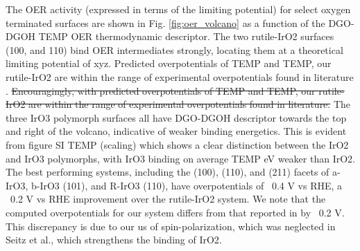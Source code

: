 The OER activity (expressed in terms of the limiting potential) for select oxygen terminated surfaces are shown in Fig. \ref{fig:oer_volcano} as a function of the DGO-DGOH TEMP OER thermodynamic descriptor.
%
The two rutile-IrO2 surfaces (100, and 110) bind OER intermediates  strongly, locating them at a theoretical limiting potential of xyz. Predicted overpotentials of TEMP and TEMP, our rutile-IrO2 are within the range of experimental overpotentials found in literature .
\sout{Encouragingly, with predicted overpotentials of TEMP and TEMP, our rutile-IrO2 are within the range of experimental overpotentials found in literature.}
%
The three IrO3 polymorph surfaces all have DGO-DGOH descriptor towards the top and right of the volcano, indicative of weaker binding energetics.   
%
This is evident from figure SI TEMP (scaling) which shows a clear distinction between the IrO2 and IrO3 polymorphs, with IrO3 binding on average TEMP eV weaker than IrO2.
%
The best performing systems, including the (100), (110), and (211) facets of a-IrO3, b-IrO3 (101), and R-IrO3 (110), have overpotentials of ~0.4 V vs RHE,
a ~0.2 V vs RHE improvement over the rutile-IrO2 system.
%
We note that the computed  overpotentials for our \rIrOtwo system differs from that reported in \cite{Seitz2016} by ~0.2 V. This discrepancy is due to our us of spin-polarization, which was neglected in Seitz et al., which strengthens the binding of IrO2.


